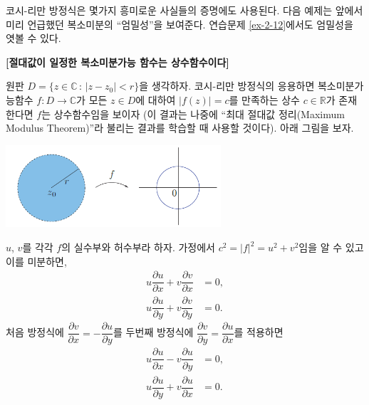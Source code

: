 코시-리만 방정식은 몇가지 흥미로운 사실들의 증명에도 사용된다.
다음 예제는 앞에서 미리 언급했던 복소미분의 ``엄밀성''을 보여준다.
연습문제 \ref{ex-2-12}에서도 엄밀성을 엿볼 수 있다.


\begin{saltexample}[label=example-2-11]{}{}
\textbf{[절대값이 일정한 복소미분가능 함수는 상수함수이다]}  %

원판 $D=\{ z\in\mathbb C \,:\, |z-z_0| <r \}$을 생각하자.
코시-리만 방정식의 응용하면 복소미분가능함수 $f: D \to \mathbb C$가
모든 $z\in D$에 대하여 $|f(z)| =c$를 만족하는 상수 $c\in\mathbb R$가 
존재한다면 $f$는 상수함수임을 보이자 
(이 결과는 나중에 ``최대 절대값 정리(Maximum Modulus Theorem)''라 불리는 결과를
학습할 때 사용할 것이다).
아래 그림을 보자.

\begin{center}
\includegraphics[width=0.6\textwidth]{./SaltChapter/fig-2-0-2}
\end{center}

$u$, $v$를 각각 $f$의 실수부와 허수부라 하자. 
가정에서 $c^2=|f|^2 = u^2 + v^2$임을 알 수 있고 이를 미분하면,
\begin{align*}
u\dfrac{\partial u}{\partial x} + v\dfrac{\partial v}{\partial x} &= 0, \\
u\dfrac{\partial u}{\partial y} + v\dfrac{\partial v}{\partial y} &= 0.
\end{align*}
처음 방정식에 $\dfrac{\partial v}{\partial x} = - \dfrac{\partial u}{\partial y}$를
두번째 방정식에 $\dfrac{\partial v}{\partial y} = \dfrac{\partial u}{\partial x}$를
적용하면
\begin{eqnarray}
u\dfrac{\partial u}{\partial x} - v\dfrac{\partial u}{\partial y} &= 0, \label{eq-2-8}\\
u\dfrac{\partial u}{\partial y} + v\dfrac{\partial u}{\partial x} &= 0. \label{eq-2-9}
\end{eqnarray}


\end{saltexample}
